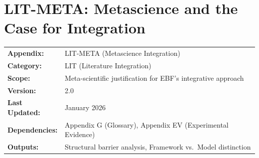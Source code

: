 %
%
%
%
%

\chapter{LIT-META: Metascience and the Case for Integration}
\label{app:lit-meta}


\begin{tcolorbox}[colback=orange!5!white, colframe=orange!75!black,
    title=\textbf{Appendix LIT-META: Literature Integration}]

\begin{tabular}{@{}ll@{}}
\textbf{Appendix:} & LIT-META (Metascience Integration) \\
\textbf{Category:} & LIT (Literature Integration) \\
\textbf{Scope:} & Meta-scientific justification for EBF's integrative approach \\
\textbf{Version:} & 2.0 \\
\textbf{Last Updated:} & January 2026 \\
\textbf{Dependencies:} & Appendix G (Glossary), Appendix EV (Experimental Evidence) \\
\textbf{Outputs:} & Structural barrier analysis, Framework vs.\ Model distinction \\
\end{tabular}

\end{tcolorbox}


